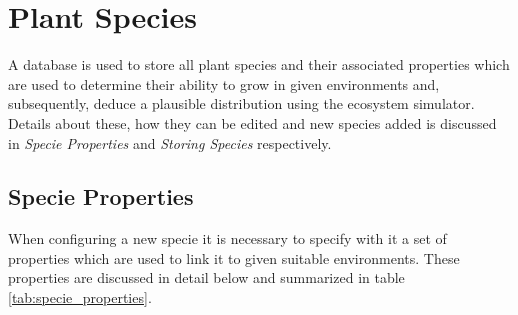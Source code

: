 \section{Plant Species}

A database is used to store all plant species and their associated properties which are used to determine their ability to grow in given environments and, subsequently, deduce a plausible distribution using the ecosystem simulator. Details about these, how they can be edited and new species added is discussed in \textit{Specie Properties} and  \textit{Storing Species} respectively.

\subsection{Specie Properties}

When configuring a new specie it is necessary to specify with it a set of properties which are used to link it to given suitable environments. These properties are discussed in detail below and summarized in table \ref{tab:specie_properties}.

